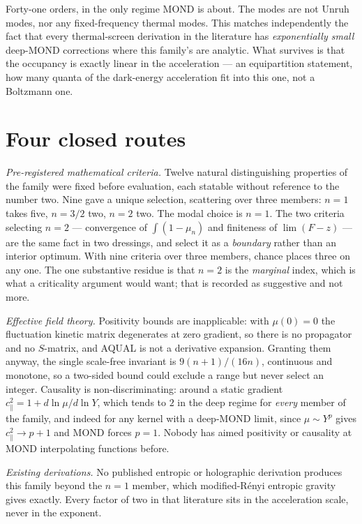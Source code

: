\documentclass[11pt,letterpaper]{article}
\begin{document}
Forty-one orders, in the only regime MOND is about. The modes are not Unruh modes, nor any fixed-frequency thermal modes. This matches independently the fact that every thermal-screen derivation in the literature has \emph{exponentially small} deep-MOND corrections where this family's are analytic. What survives is that the occupancy is exactly linear in the acceleration --- an equipartition statement, how many quanta of the dark-energy acceleration fit into this one, not a Boltzmann one.

\section{Four closed routes}
\emph{Pre-registered mathematical criteria.} Twelve natural distinguishing properties of the family were fixed before evaluation, each statable without reference to the number two. Nine gave a unique selection, scattering over three members: $n=1$ takes five, $n=3/2$ two, $n=2$ two. The modal choice is $n=1$. The two criteria selecting $n=2$ --- convergence of $\int(1-\mu_n)$ and finiteness of $\lim(F-z)$ --- are the same fact in two dressings, and select it as a \emph{boundary} rather than an interior optimum. With nine criteria over three members, chance places three on any one. The one substantive residue is that $n=2$ is the \emph{marginal} index, which is what a criticality argument would want; that is recorded as suggestive and not more.

\emph{Effective field theory.} Positivity bounds are inapplicable: with $\mu(0)=0$ the fluctuation kinetic matrix degenerates at zero gradient, so there is no propagator and no $S$-matrix, and AQUAL is not a derivative expansion. Granting them anyway, the single scale-free invariant is $9(n+1)/(16n)$, continuous and monotone, so a two-sided bound could exclude a range but never select an integer. Causality is non-discriminating: around a static gradient $c_\parallel^2=1+d\ln\mu/d\ln Y$, which tends to $2$ in the deep regime for \emph{every} member of the family, and indeed for any kernel with a deep-MOND limit, since $\mu\sim Y^p$ gives $c_\parallel^2\to p+1$ and MOND forces $p=1$. Nobody has aimed positivity or causality at MOND interpolating functions before.

\emph{Existing derivations.} No published entropic or holographic derivation produces this family beyond the $n=1$ member, which modified-R\'enyi entropic gravity gives exactly. Every factor of two in that literature sits in the acceleration scale, never in the exponent.
\end{document}
